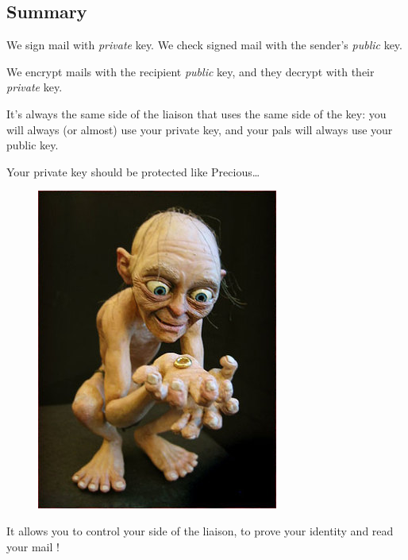 \subsection{Summary}\label{summary}

We sign mail with \emph{private} key. We check signed mail with the
sender's \emph{public} key.

We encrypt mails with the recipient \emph{public} key, and they decrypt
with their \emph{private} key.

It's always the same side of the liaison that uses the same side of the
key: you will always (or almost) use your private key, and your pals
will always use your public key.

Your private key should be protected like Precious\ldots{}

\begin{figure}[htbp]
\centering
\includegraphics{./images/gollum.jpg}
\caption{}
\end{figure}

It allows you to control your side of the liaison, to prove your
identity and read your mail !